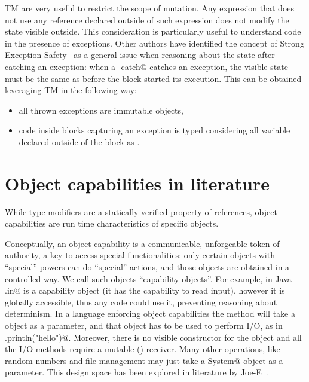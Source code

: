 \loseSpace

TM are very useful to restrict the scope of mutation. 
Any expression that does not use any \Q@mut@ 
reference declared outside of such expression does not modify the state visible outside. This consideration is particularly useful to understand code in the presence of exceptions. Other authors have identified the concept of Strong Exception Safety~\cite{Abrahams2000} as a general issue when reasoning about the state after catching an exception:
when a \Q@try-catch@ catches an exception, the visible state must be the same as before the \Q@try@ block started its execution.
This can be obtained leveraging TM in the following way:
\begin{itemize}
\item all thrown exceptions are immutable objects,
\item code inside \Q@try@ blocks capturing an exception is typed considering all 
\Q@mut@ variable declared outside of the block as \Q@read@.
\end{itemize}




\section{Object capabilities in literature}

While type modifiers are a statically verified property of references, object capabilities are run time characteristics of specific objects.

Conceptually, an object capability is a communicable, unforgeable token of authority, a key to access special functionalities: only certain objects with ``special'' powers can do ``special'' actions, and those objects are obtained in a controlled way. We call such objects ``capability objects''. 
For example, in Java \Q@System.in@ is a capability object (it has the capability to read input), however it is globally accessible, thus any code could use it, preventing reasoning about determinism.
In a language enforcing object capabilities the \Q@main@ method will take a \Q@System@ object as a parameter, and that object has to be used to perform I/O, as in \Q@mySystem.println("hello")@.
Moreover, there is no visible constructor for the \Q@System@ object and all the I/O methods require a mutable (\Q@mut@) receiver.
Many other operations, like random numbers and file management may just take a \Q@mut System@ object as a parameter.
\noindent This design space has been explored in literature by Joe-E~\cite{finifter2008verifiable}.


